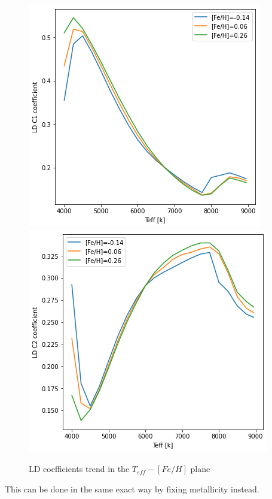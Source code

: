 \documentclass[a4paper,11pt,twocolumn]{article}
\begin{document}
\begin{figure}[H]
    \centering  
    \includegraphics[scale=0.5, angle=0]{../pictures/Claret2017/double_c1}
    \includegraphics[scale=0.5, angle=0]{../pictures/Claret2017/double_c2}
    \caption{LD coefficients trend in the $T_{eff}-[Fe/H]$ plane}
\end{figure}
This can be done in the same exact way by fixing metallicity instead.
\end{document}
